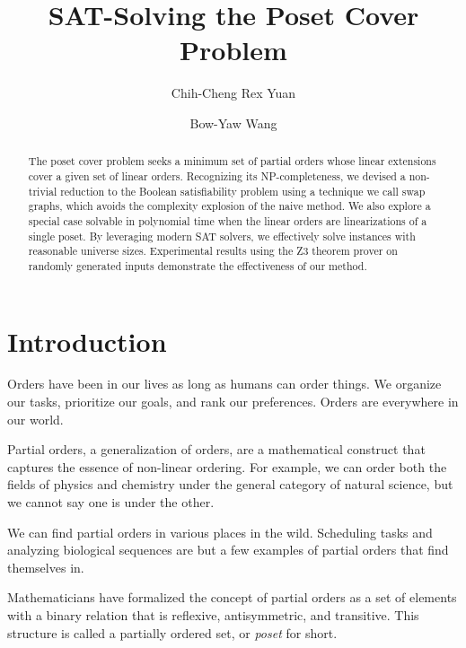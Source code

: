 \documentclass[12pt]{llncs}
\begin{document}
\title{SAT-Solving the Poset Cover Problem}

\author{Chih-Cheng Rex Yuan \and
        Bow-Yaw Wang}


\maketitle

\begin{abstract}
The poset cover problem seeks a minimum set of partial orders whose linear extensions cover a given set of linear orders. Recognizing its NP-completeness, we devised a non-trivial reduction to the Boolean satisfiability problem using a technique we call swap graphs, which avoids the complexity explosion of the naive method. We also explore a special case solvable in polynomial time when the linear orders are linearizations of a single poset. By leveraging modern SAT solvers, we effectively solve instances with reasonable universe sizes. Experimental results using the Z3 theorem prover on randomly generated inputs demonstrate the effectiveness of our method.
\end{abstract}

\section{Introduction}

Orders have been in our lives as long as humans can order things. We organize our tasks, prioritize our goals, and rank our preferences. Orders are everywhere in our world.

Partial orders, a generalization of orders, are a mathematical construct that captures the essence of non-linear ordering. For example, we can order both the fields of physics and chemistry under the general category of natural science, but we cannot say one is under the other.

We can find partial orders in various places in the wild. Scheduling tasks and analyzing biological sequences are but a few examples of partial orders that find themselves in\cite{heath2013poset,fernandez2013mining}.

Mathematicians have formalized the concept of partial orders as a set of elements with a binary relation that is reflexive, antisymmetric, and transitive. This structure is called a partially ordered set, or \emph{poset} for short.
\end{document}
